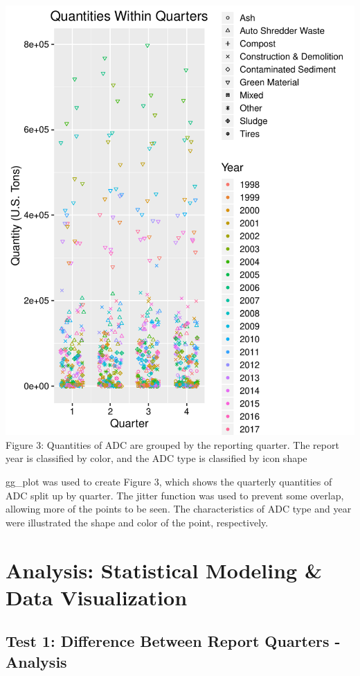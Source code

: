 \documentclass[12pt,]{article}
\begin{document}
\includegraphics{SKo_Project_Template_files/figure-latex/explore_graphs4-1.pdf}
Figure 3: Quantities of ADC are grouped by the reporting quarter. The
report year is classified by color, and the ADC type is classified by
icon shape

gg\_plot was used to create Figure 3, which shows the quarterly
quantities of ADC split up by quarter. The jitter function was used to
prevent some overlap, allowing more of the points to be seen. The
characteristics of ADC type and year were illustrated the shape and
color of the point, respectively.

\newpage

\section{Analysis: Statistical Modeling \& Data
Visualization}\label{analysis-statistical-modeling-data-visualization}

\subsection{Test 1: Difference Between Report Quarters -
Analysis}\label{test-1-difference-between-report-quarters---analysis}
\end{document}
